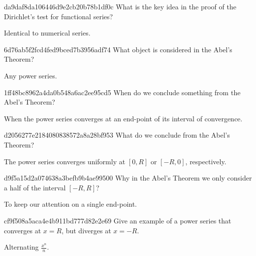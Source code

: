 \begin{note}{da9daf8da106446d9e2cb20b78b1df0c}
    What is the key idea in the proof of the Dirichlet's test for functional series?

    \begin{cloze}{1}
        Identical to numerical series.
    \end{cloze}
\end{note}

\begin{note}{6d76ab5f2fcd4fed9bced7b3956adf74}
    What object is considered in the Abel's Theorem?

    \begin{cloze}{1}
        Any power series.
    \end{cloze}
\end{note}

\begin{note}{1ff48bc8962a4da0b548a6ac2ee95cd5}
    When do we conclude something from the Abel's Theorem?

    \begin{cloze}{1}
        When the power series converges at an end-point of its interval of convergence.
    \end{cloze}
\end{note}

\begin{note}{d2056277e2184080838572a8a28bf953}
    What do we conclude from the Abel's Theorem?

    \begin{cloze}{1}
        The power series converges uniformly at \({ [0, R] }\) or \({ [-R, 0] }\), respectively.
    \end{cloze}
\end{note}

\begin{note}{d9f5a15d2a074638a3befb9b4ae99500}
    Why in the Abel's Theorem we only consider a half of the interval \({ [-R, R] }\)?

    \begin{cloze}{1}
        To keep our attention on a single end-point.
    \end{cloze}
\end{note}

\begin{note}{cf9f508a5aca4e4b911bd777d82e2e69}
    Give an example of a power series that converges at \({ x = R }\), but diverges at \({ x = -R }\).

    \begin{cloze}{1}
        Alternating \({ \frac{x^{n}}{n} }\).
    \end{cloze}
\end{note}

